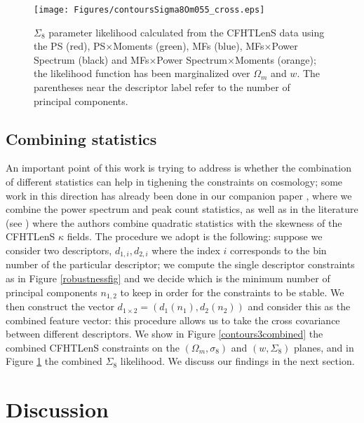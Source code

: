 \documentclass[reprint,aps,prd,superscriptaddress,showkeys,showpacs]{revtex4-1}
\begin{document}
\begin{figure}
\begin{center}
\texttt{[image: Figures/contoursSigma8Om055\_cross.eps]}
\end{center}
\caption{$\Sigma_8$ parameter likelihood calculated from the CFHTLenS data using the PS (red), PS$\times$Moments (green), MFs (blue), MFs$\times$Power Spectrum (black) and MFs$\times$Power Spectrum$\times$Moments (orange); the likelihood function has been marginalized over $\Omega_m$ and $w$. The parentheses near the descriptor label refer to the number of principal components.}
\label{likelihoodSi8cross}
\end{figure}

\subsection{Combining statistics}
An important point of this work is trying to address is whether the combination of different statistics can help in tighening the constraints on cosmology; some work in this direction has already been done in our companion paper \citep{Companion}, where we combine the power spectrum and peak count statistics, as well as in the literature (see \citep{CFHTFu}) where the authors combine quadratic statistics with the skewness of the CFHTLenS $\kappa$ fields. The procedure we adopt is the following: suppose we consider two descriptors, $d_{1,i},d_{2,i}$ where the index $i$ corresponds to the bin number of the particular descriptor; we compute the single descriptor constraints as in Figure \ref{robustnessfig} and we decide which is the minimum number of principal components $n_{1,2}$ to keep in order for the constraints to be stable. We then construct the vector $d_{1\times2} = (d_1(n_1),d_2(n_2))$ and consider this as the combined feature vector: this procedure allows us to take the cross covariance between different descriptors. We show in Figure \ref{contours3combined} the combined CFHTLenS constraints on the $(\Omega_m,\sigma_8)$ and $(w,\Sigma_8)$ planes, and in Figure \ref{likelihoodSi8cross} the combined $\Sigma_8$ likelihood. We discuss our findings in the next section. 



\section{Discussion}
\label{discussion}
\end{document}
